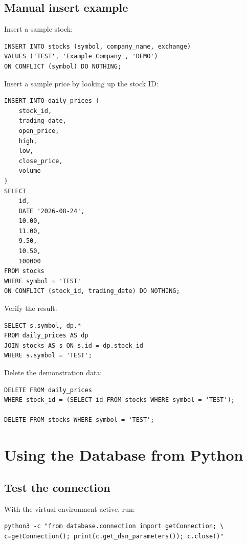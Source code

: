 \documentclass[11pt,a4paper]{article}
\begin{document}
\subsection{Manual insert example}

Insert a sample stock:

\begin{lstlisting}[style=sql]
INSERT INTO stocks (symbol, company_name, exchange)
VALUES ('TEST', 'Example Company', 'DEMO')
ON CONFLICT (symbol) DO NOTHING;
\end{lstlisting}

Insert a sample price by looking up the stock ID:

\begin{lstlisting}[style=sql]
INSERT INTO daily_prices (
    stock_id,
    trading_date,
    open_price,
    high,
    low,
    close_price,
    volume
)
SELECT
    id,
    DATE '2026-08-24',
    10.00,
    11.00,
    9.50,
    10.50,
    100000
FROM stocks
WHERE symbol = 'TEST'
ON CONFLICT (stock_id, trading_date) DO NOTHING;
\end{lstlisting}

Verify the result:

\begin{lstlisting}[style=sql]
SELECT s.symbol, dp.*
FROM daily_prices AS dp
JOIN stocks AS s ON s.id = dp.stock_id
WHERE s.symbol = 'TEST';
\end{lstlisting}

Delete the demonstration data:

\begin{lstlisting}[style=sql]
DELETE FROM daily_prices
WHERE stock_id = (SELECT id FROM stocks WHERE symbol = 'TEST');

DELETE FROM stocks WHERE symbol = 'TEST';
\end{lstlisting}

\section{Using the Database from Python}

\subsection{Test the connection}

With the virtual environment active, run:

\begin{lstlisting}[style=terminal]
python3 -c "from database.connection import getConnection; \
c=getConnection(); print(c.get_dsn_parameters()); c.close()"
\end{lstlisting}
\end{document}
